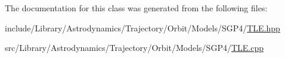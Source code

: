 The documentation for this class was generated from the following files\+:\begin{DoxyCompactItemize}
\item 
include/\+Library/\+Astrodynamics/\+Trajectory/\+Orbit/\+Models/\+S\+G\+P4/\hyperlink{_t_l_e_8hpp}{T\+L\+E.\+hpp}\item 
src/\+Library/\+Astrodynamics/\+Trajectory/\+Orbit/\+Models/\+S\+G\+P4/\hyperlink{_t_l_e_8cpp}{T\+L\+E.\+cpp}\end{DoxyCompactItemize}
